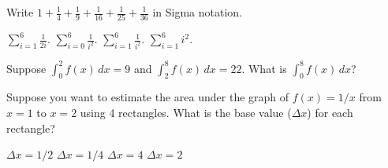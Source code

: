 \documentclass[addpoints, 12pt]{exam}%
\newcommand{\spc}{\vspace*{0.5cm}}
\begin{document}
\begin{questions}
\spc

\question[1]

Write $1 + \frac{1}{4} + \frac{1}{9} + \frac{1}{16} + \frac{1}{25} + \frac{1}{36}$ in Sigma notation.

\begin{multicols}{2}
\begin{choices}
\choice $\sum_{i=1}^{6} \frac{1}{2i}$.
\choice $\sum_{i=0}^{6} \frac{1}{i^2}$.
\CorrectChoice $\sum_{i=1}^{6} \frac{1}{i^2}$.
\choice $\sum_{i=1}^{6} i^2$.
\end{choices}
\end{multicols}

\spc

\question[1]

Suppose $\int_{0}^{2} f(x) \,dx = 9$ and $\int_{2}^{8} f(x) \,dx = 22$. What is $\int_{0}^{8} f(x) \,dx$?

\begin{multicols}{2}
\begin{choices}
\end{choices}
\end{multicols}

\spc

\question[1]

Suppose you want to estimate the area under the graph of $f(x) = 1/x$ from $x=1$ to $x=2$ using 4 rectangles. What is the base value ($\Delta x$) for each rectangle?

\begin{multicols}{2}
\begin{choices}
\choice $\Delta x = 1/2$
\CorrectChoice $\Delta x = 1/4$
\choice $\Delta x = 4$
\choice $\Delta x = 2$

\end{choices}  
\end{multicols}

\spc

\end{questions}
\end{document}
